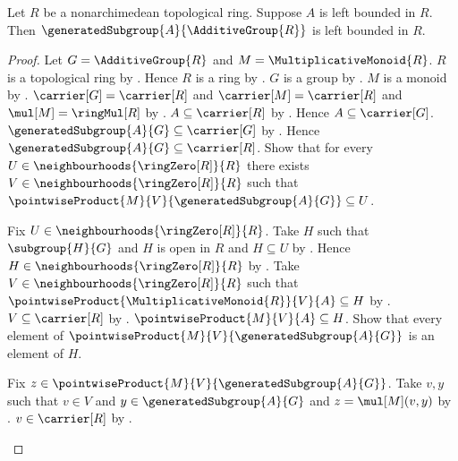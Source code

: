 \begin{theorem}\label{nonarchimedean_generated_subgroup_left_bounded}
    Let $R$ be a nonarchimedean topological ring.
    Suppose $A$ is left bounded in $R$.
    Then $\generatedSubgroup{A}{\AdditiveGroup{R}}$ is left bounded in $R$.
\end{theorem}
\begin{proof}
    Let $G=\AdditiveGroup{R}$ and $M=\MultiplicativeMonoid{R}$.
    $R$ is a topological ring by
        .
    Hence $R$ is a ring by .
    $G$ is a group by .
    $M$ is a monoid by .
    $\carrier[G]=\carrier[R]$ and $\carrier[M]=\carrier[R]$ and
        $\mul[M]=\ringMul[R]$ by
        .
    $A\subseteq\carrier[R]$ by .
    Hence $A\subseteq\carrier[G]$.
    $\generatedSubgroup{A}{G}\subseteq\carrier[G]$ by
        .
    Hence $\generatedSubgroup{A}{G}\subseteq\carrier[R]$.
    Show that for every $U\in\neighbourhoods{\ringZero[R]}{R}$ there exists
        $V\in\neighbourhoods{\ringZero[R]}{R}$ such that
        $\pointwiseProduct{M}{V}{\generatedSubgroup{A}{G}}\subseteq U$.
    \begin{subproof}
        Fix $U\in\neighbourhoods{\ringZero[R]}{R}$.
        Take $H$ such that $\subgroup{H}{G}$ and $H$ is open in $R$ and
            $H\subseteq U$ by
            .
        Hence $H\in\neighbourhoods{\ringZero[R]}{R}$ by
            .
        Take $V\in\neighbourhoods{\ringZero[R]}{R}$ such that
            $\pointwiseProduct{\MultiplicativeMonoid{R}}{V}{A}\subseteq H$
            by .
        $V\subseteq\carrier[R]$ by
            .
        $\pointwiseProduct{M}{V}{A}\subseteq H$.
        Show that every element of
            $\pointwiseProduct{M}{V}{\generatedSubgroup{A}{G}}$ is an
            element of $H$.
        \begin{subproof}
            Fix $z\in\pointwiseProduct{M}{V}{\generatedSubgroup{A}{G}}$.
            Take $v,y$ such that $v\in V$ and
                $y\in\generatedSubgroup{A}{G}$ and $z=\mul[M](v,y)$ by
                .
            $v\in\carrier[R]$ by .

\end{subproof}
\end{subproof}
\end{proof}
